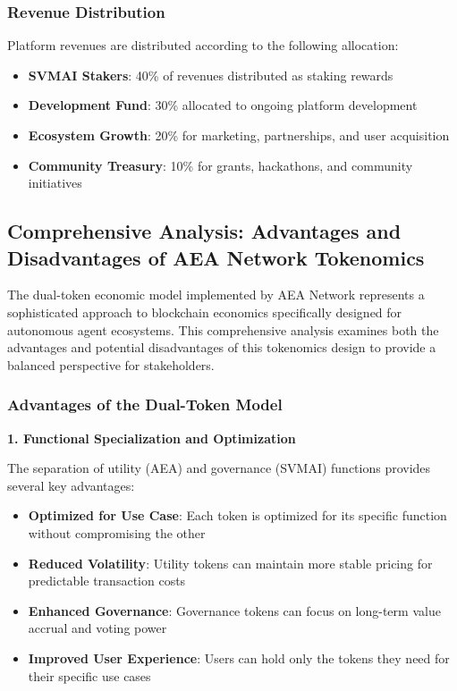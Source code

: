 \documentclass[12pt,a4paper]{article}
\begin{document}
\subsubsection{Revenue Distribution}

Platform revenues are distributed according to the following allocation:

\begin{itemize}
\item \textbf{SVMAI Stakers}: 40\% of revenues distributed as staking rewards
\item \textbf{Development Fund}: 30\% allocated to ongoing platform development
\item \textbf{Ecosystem Growth}: 20\% for marketing, partnerships, and user acquisition
\item \textbf{Community Treasury}: 10\% for grants, hackathons, and community initiatives
\end{itemize}

\subsection{Comprehensive Analysis: Advantages and Disadvantages of AEA Network Tokenomics}

The dual-token economic model implemented by AEA Network represents a sophisticated approach to blockchain economics specifically designed for autonomous agent ecosystems. This comprehensive analysis examines both the advantages and potential disadvantages of this tokenomics design to provide a balanced perspective for stakeholders.

\subsubsection{Advantages of the Dual-Token Model}

\textbf{1. Functional Specialization and Optimization}

The separation of utility (AEA) and governance (SVMAI) functions provides several key advantages:

\begin{itemize}
\item \textbf{Optimized for Use Case}: Each token is optimized for its specific function without compromising the other
\item \textbf{Reduced Volatility}: Utility tokens can maintain more stable pricing for predictable transaction costs
\item \textbf{Enhanced Governance}: Governance tokens can focus on long-term value accrual and voting power
\item \textbf{Improved User Experience}: Users can hold only the tokens they need for their specific use cases
\end{itemize}
\end{document}
